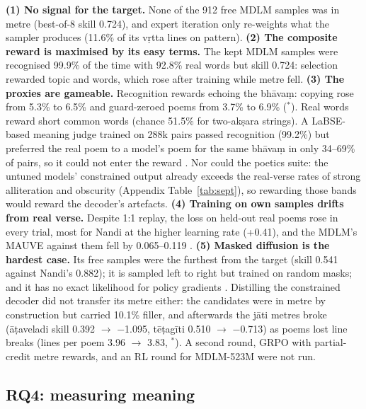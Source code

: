 \documentclass[11pt]{article}
\newcommand{\sig}{$^{\ast}$}
\begin{document}
\textbf{(1) No signal for the target.} None of the 912 free MDLM samples was in metre (best-of-8 skill 0.724),
and expert iteration only re-weights what the sampler produces (11.6\% of its vṛtta lines on pattern). \textbf{(2) The composite
reward is maximised by its easy terms.} The kept MDLM samples were recognised 99.9\% of the time with 92.8\%
real words but skill 0.724: selection rewarded topic and words, which rose after training while metre fell.
\textbf{(3) The proxies are gameable.} Recognition rewards echoing the bhāvaṃ: copying rose from 5.3\% to
6.5\% and guard-zeroed poems from 3.7\% to 6.9\% (\sig). Real words reward short common words (chance 51.5\%
for two-akṣara strings). A LaBSE-based meaning judge trained on 288k pairs passed recognition (99.2\%) but
preferred the real poem to a model's poem for the same bhāvaṃ in only 34--69\% of pairs, so it could not
enter the reward \citep{gao2023overoptimization}. Nor could the poetics suite: the untuned models' constrained
output already exceeds the real-verse rates of strong alliteration and obscurity (Appendix
Table~\ref{tab:sept}), so rewarding those bands would reward the decoder's artefacts. \textbf{(4) Training on own samples drifts from
real verse.} Despite 1:1 replay, the loss on held-out real poems rose in every trial, most for Nandi at the
higher learning rate (+0.41), and the MDLM's MAUVE against them fell by 0.065--0.119 \citep{shumailov2024collapse}. \textbf{(5) Masked diffusion is the hardest
case.} Its free samples were the furthest from the target (skill 0.541 against Nandi's 0.882); it is sampled
left to right but trained on random masks; and it has no exact likelihood for policy gradients
\citep{zhao2025d1}. Distilling the constrained decoder
did not transfer its metre either: the candidates were in metre by construction but carried 10.1\% filler,
and afterwards the jāti metres broke (āṭaveladi skill 0.392 $\to$ $-$1.095, tēṭagīti 0.510 $\to$ $-$0.713)
as poems lost line breaks (lines per poem 3.96 $\to$ 3.83, \sig). A second round, GRPO with partial-credit
metre rewards, and an RL round for MDLM-523M were not run.

\subsection{RQ4: measuring meaning}\label{sec:rq4}
\end{document}
